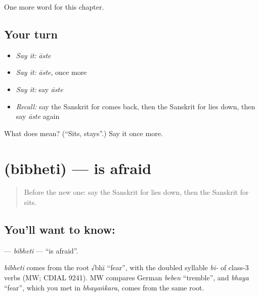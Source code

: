 \begin{grammarlens}[title={What you've built}]
One more word for this chapter.
\end{grammarlens}

\subsection*{Your turn}
\begin{itemize}
\raggedright
  \item \emph{Say it:} \emph{āste}
  \item \emph{Say it:} \emph{āste}, once more
  \item \emph{Say it:} say \emph{āste}
  \item \emph{Recall:} say the Sanskrit for comes back, then the Sanskrit for lies down, then say \emph{āste} again
\end{itemize}

\begin{tcolorbox}[breakable,colback=teal!4,colframe=teal!35!black,title={Before you move on}]
What does  mean? (\textquotedblleft{}Sits, stays\textquotedblright{}.) Say it once more.
\end{tcolorbox}
\section[\texorpdfstring{\sk{बिभेति} (bibheti)}{बिभेति (bibheti)}]{ (bibheti) — is afraid}

\label{lesson:SA-C143-bibheti}



\begin{quote}
Before the new one: say the Sanskrit for lies down, then the Sanskrit for sits.
\end{quote}

\subsection*{You'll want to know: }
\textbf{} — \emph{bibheti} — \textquotedblleft{}is afraid\textquotedblright{}.

\begin{cousinweb}
\emph{bibheti} comes from the root √bhī \textquotedblleft{}fear\textquotedblright{}, with the doubled syllable \emph{bi-} of class-3 verbs (MW; CDIAL 9241). MW compares German \emph{beben} \textquotedblleft{}tremble\textquotedblright{}, and \emph{bhaya} \textquotedblleft{}fear\textquotedblright{}, which you met in \emph{bhayaṅkara}, comes from the same root.
\end{cousinweb}

